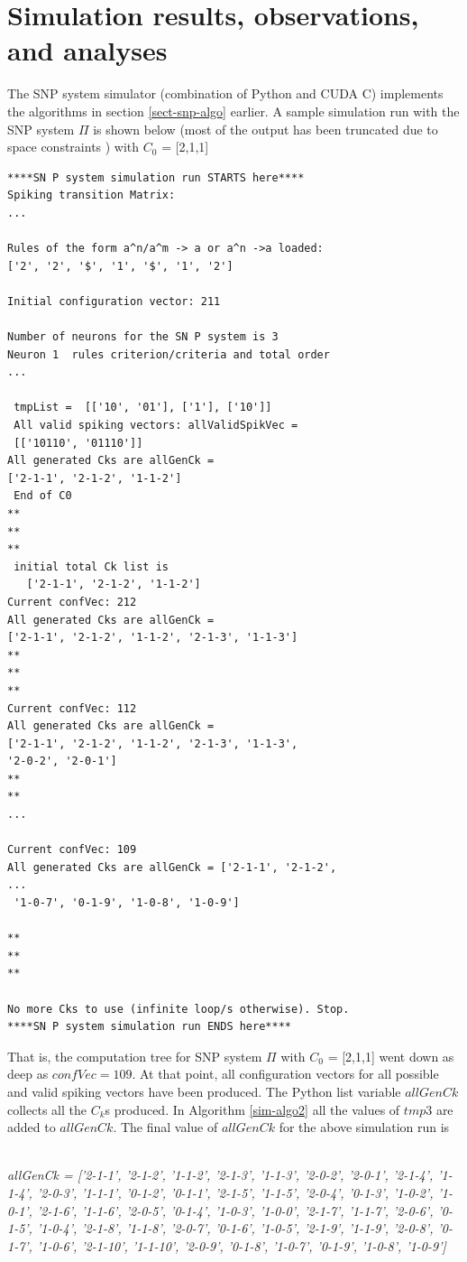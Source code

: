 \documentclass{svmultm}
\begin{document}
\section{Simulation results, observations, and analyses}
The SNP system simulator (combination of Python
and CUDA C) implements the algorithms in section \ref{sect-snp-algo}
earlier. A sample simulation run with the SNP system $\Pi$ is
shown below (most of the output has been truncated due to space constraints ) with $C_0$ = [2,1,1]
\begin{verbatim}
****SN P system simulation run STARTS here****
Spiking transition Matrix: 
... 

Rules of the form a^n/a^m -> a or a^n ->a loaded: 
['2', '2', '$', '1', '$', '1', '2'] 

Initial configuration vector: 211
 
Number of neurons for the SN P system is 3 
Neuron 1  rules criterion/criteria and total order 
... 

 tmpList =  [['10', '01'], ['1'], ['10']] 
 All valid spiking vectors: allValidSpikVec =
 [['10110', '01110']] 
All generated Cks are allGenCk =
['2-1-1', '2-1-2', '1-1-2'] 
 End of C0 
** 
** 
** 
 initial total Ck list is
   ['2-1-1', '2-1-2', '1-1-2'] 
Current confVec: 212 
All generated Cks are allGenCk =
['2-1-1', '2-1-2', '1-1-2', '2-1-3', '1-1-3'] 
** 
** 
** 
Current confVec: 112 
All generated Cks are allGenCk =
['2-1-1', '2-1-2', '1-1-2', '2-1-3', '1-1-3',
'2-0-2', '2-0-1'] 
** 
** 
...

Current confVec: 109
All generated Cks are allGenCk = ['2-1-1', '2-1-2',
...
 '1-0-7', '0-1-9', '1-0-8', '1-0-9']

**
**
**

No more Cks to use (infinite loop/s otherwise). Stop.
****SN P system simulation run ENDS here****
\end{verbatim}

That is, the computation tree for SNP system $\Pi$ with $C_0$ = [2,1,1] went down as deep as $confVec = 109$. At that point, all configuration vectors for all possible and valid spiking vectors have been produced. The Python list variable $allGenCk$ collects all the $C_k$s produced. In Algorithm \ref{sim-algo2} all the values of $tmp3$ are added to $allGenCk$. The final value of $allGenCk$ for the above simulation run is

~\\
\textit{
allGenCk = ['2-1-1', '2-1-2', '1-1-2', '2-1-3', '1-1-3', '2-0-2', '2-0-1', '2-1-4', '1-1-4', '2-0-3', '1-1-1', '0-1-2', '0-1-1', '2-1-5', '1-1-5', '2-0-4', '0-1-3', '1-0-2', '1-0-1', '2-1-6', '1-1-6', '2-0-5', '0-1-4', '1-0-3', '1-0-0', '2-1-7', '1-1-7', '2-0-6', '0-1-5', '1-0-4', '2-1-8', '1-1-8', '2-0-7', '0-1-6', '1-0-5', '2-1-9', '1-1-9', '2-0-8', '0-1-7', '1-0-6', '2-1-10', '1-1-10', '2-0-9', '0-1-8', '1-0-7', '0-1-9', '1-0-8', '1-0-9'] }
\end{document}
